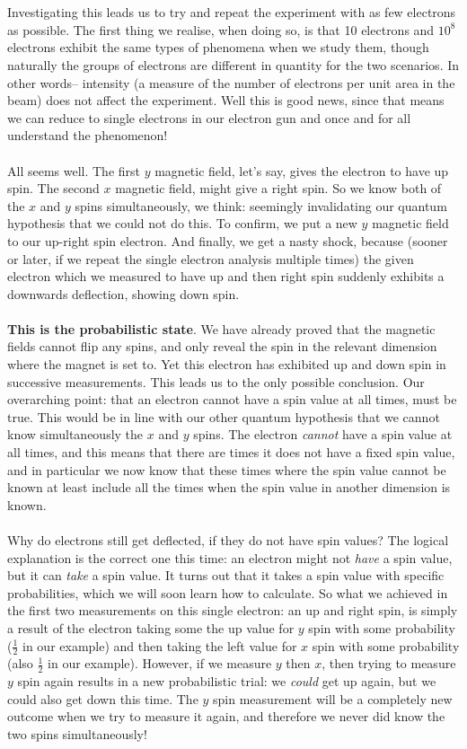 \\\\
Investigating this leads us to try and repeat the experiment with as few electrons as possible.
The first thing we realise, when doing so, is that 10 electrons and $10^8$ electrons exhibit the same types of phenomena when we study them, though naturally the groups of electrons are different in quantity for the two scenarios. In other words-- intensity (a measure of the number of electrons per unit area in the beam) does not affect the experiment. Well this is good news, since that means we can reduce to single electrons in our electron gun and once and for all understand the phenomenon!
\\\\
All seems well. The first $y$ magnetic field, let's say, gives the electron to have up spin. The second $x$ magnetic field, might give a right spin. So we know both of the $x$ and $y$ spins simultaneously, we think: seemingly invalidating our quantum hypothesis that we could not do this. To confirm, we put a new $y$ magnetic field to our up-right spin electron. And finally, we get a nasty shock, because (sooner or later, if we repeat the single electron analysis multiple times) the given electron which we measured to have up and then right spin suddenly exhibits a downwards deflection, showing down spin.
\\\\
\textbf{This is the probabilistic state}. We have already proved that the magnetic fields cannot flip any spins, and only reveal the spin in the relevant dimension where the magnet is set to. Yet this electron has exhibited up and down spin in successive measurements. This leads us to the only possible conclusion. Our overarching point: that an electron cannot have a spin value at all times, must be true. This would be in line with our other quantum hypothesis that we cannot know simultaneously the $x$ and $y$ spins. The electron \textit{cannot} have a spin value at all times, and this means that there are times it does not have a fixed spin value, and in particular we now know that these times where the spin value cannot be known at least include all the times when the spin value in another dimension is known.
\\\\
Why do electrons still get deflected, if they do not have spin values? The logical explanation is the correct one this time: an electron might not \textit{have} a spin value, but it can \textit{take} a spin value. It turns out that it takes a spin value with specific probabilities, which we will soon learn how to calculate. So what we achieved in the first two measurements on this single electron: an up and right spin, is simply a result of the electron taking some the up value for $y$ spin with some probability ($\frac{1}{2}$ in our example) and then taking the left value for $x$ spin with some probability (also $\frac{1}{2}$ in our example). However, if we measure $y$ then $x$, then trying to measure $y$ spin again results in a new probabilistic trial: we \textit{could} get up again, but we could also get down this time. The $y$ spin measurement will be a completely new outcome when we try to measure it again, and therefore we never did know the two spins simultaneously!
